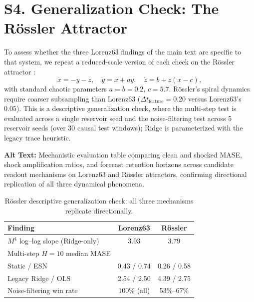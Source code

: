 \documentclass[aip,cha,reprint,amsmath,amssymb]{revtex4-2}
\begin{document}
\section{S4. Generalization Check: The R\"ossler Attractor}
\label{sec:rossler}

To assess whether the three Lorenz63 findings of the main text are specific to that system, we repeat a reduced-scale version of each check on the R\"ossler attractor \cite{rossler1976equation}:
\begin{equation}
\dot x = -y - z, \quad \dot y = x + ay, \quad \dot z = b + z(x-c),
\end{equation}
with standard chaotic parameters $a=b=0.2$, $c=5.7$. R\"ossler's spiral dynamics require coarser subsampling than Lorenz63 ($\Delta t_{\text{feature}}=0.20$ versus Lorenz63's $0.05$). This is a descriptive generalization check, where the multi-step test is evaluated across a single reservoir seed and the noise-filtering test across 5 reservoir seeds (over 30 causal test windows); Ridge is parameterized with the legacy trace heuristic.

\begin{table}[h]
\centering
\caption{R\"ossler descriptive generalization check: all three mechanisms replicate directionally.}
\label{tab:rossler}
\vspace{2pt}
\noindent\textbf{Alt Text:} Mechanistic evaluation table comparing clean and shocked MASE, shock amplification ratios, and forecast retention horizons across candidate readout mechanisms on Lorenz63 and Rössler attractors, confirming directional replication of all three dynamical phenomena.
\begin{ruledtabular}
\begin{tabular}{p{3.2cm}cc}
Finding & Lorenz63 & R\"ossler \\
\midrule
$M^4$ log--log slope (Ridge-only) & 3.93 & 3.79 \\
Multi-step $H{=}10$ median MASE & & \\
\quad Static / ESN & 0.43 / 0.74 & 0.26 / 0.58 \\
\quad Legacy Ridge / OLS & 2.54 / 2.50 & 4.39 / 2.75 \\
Noise-filtering win rate & 100\% (all) & 53\%--67\% \\
\end{tabular}
\end{ruledtabular}
\end{table}
\end{document}
